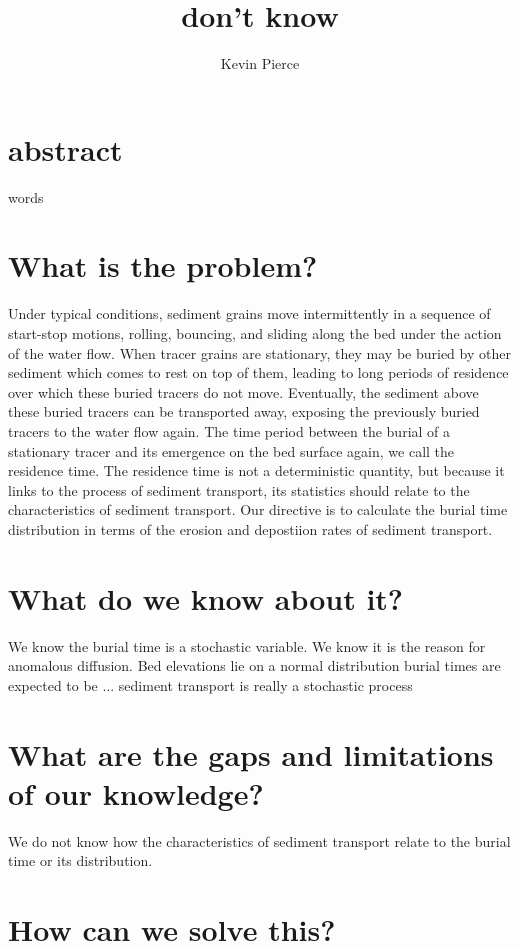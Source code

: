 \documentclass{article}
\begin{document}
\title{don't know}
\author{Kevin Pierce}
\maketitle
\section{abstract}
words

\section{What is the problem?}

Under typical conditions, sediment grains move intermittently in a sequence of start-stop motions, rolling, bouncing, and sliding along the bed under the action of the water flow.
When tracer grains are stationary, they may be buried by other sediment which comes to rest on top of them, leading to long periods of residence over which these buried tracers do not move.
Eventually, the sediment above these buried tracers can be transported away, exposing the previously buried tracers to the water flow again. 
The time period between the burial of a stationary tracer and its emergence on the bed surface again, we call the residence time. 
The residence time is not a deterministic quantity, but because it links to the process of sediment transport, its statistics should relate to the characteristics of sediment transport. 
Our directive is to calculate the burial time distribution in terms of the erosion and depostiion rates of sediment transport. 

\section{What do we know about it?}

We know the burial time is a stochastic variable. 
We know it is the reason for anomalous diffusion. 
Bed elevations lie on a normal distribution
burial times are expected to be ... 
sediment transport is really a stochastic process


\section{What are the gaps and limitations of our knowledge?}

We do not know how the characteristics of sediment transport relate to the burial time or its distribution. 

\section{How can we solve this?}
\end{document}
